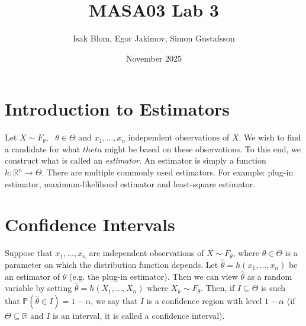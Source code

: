 \documentclass{article}
\title{MASA03 Lab 3}
\author{Isak Blom, Egor Jakimov, Simon Gustafsson}
\date{November 2025}
\begin{document}
\maketitle

\section*{Introduction to Estimators}
Let $X \sim F_\theta, \text{ } \theta \in \Theta$ and $x_1,\ldots, x_n$ independent observations of $X$. We wish to find a candidate for what $theta$ might be based on these observations. To this end, we construct what is called an \textit{estimator}. An estimator is simply a function $h:\mathbb{R}^n \to \Theta$. There are multiple commonly used estimators. For example: plug-in estimator, maximum-likelihood estimator and least-square estimator. 

\section{Confidence Intervals}

Suppose that $x_1,\dots,x_n$ are independent observations of $X\sim F_\theta$, where $\theta\in\Theta$ is a parameter on which the distribution function depends. Let $\hat{\theta}=h(x_1,\dots,x_n)$ be an estimator of $\theta$ (e.g. the plug-in estimator). Then we can view $\hat{\theta}$ as a random variable by setting $\hat{\theta} = h(X_1,\dots,X_n)$ where $X_k\sim F_\theta$. Then, if $I\subseteq\Theta$ is such that $\mathbb{P}(\hat{\theta}\in I)=1-\alpha$, we say that $I$ is a confidence region with level $1-\alpha$ (if $\Theta\subseteq\mathbb{R}$ and $I$ is an interval, it is called a confidence interval).\\
\end{document}
